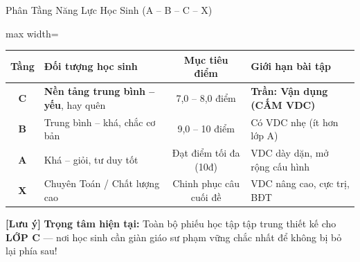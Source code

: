 \documentclass[aspectratio=169,11pt]{beamer}
\begin{document}
\begin{frame}{Phân Tầng Năng Lực Học Sinh (A – B – C – X)}
  \begin{adjustbox}{max width=\textwidth}
    \begin{tabular}{|c|l|c|l|}
      \hline
      \rowcolor{brand!15}
      \textbf{Tầng} & \textbf{Đối tượng học sinh} & \textbf{Mục tiêu điểm} & \textbf{Giới hạn bài tập} \\
      \hline
      \rowcolor{brand!5}
      \textbf{\color{brand}C} & \textbf{Nền tảng trung bình – yếu}, hay quên & 7,0 – 8,0 điểm & \textbf{\color{danger}Trần: Vận dụng (CẤM VDC)} \\
      \hline
      \textbf{B} & Trung bình – khá, chắc cơ bản & 9,0 – 10 điểm & Có VDC nhẹ (ít hơn lớp A) \\
      \hline
      \textbf{A} & Khá – giỏi, tư duy tốt & Đạt điểm tối đa (10đ) & VDC dày dặn, mở rộng cấu hình \\
      \hline
      \textbf{\color{accent}X} & Chuyên Toán / Chất lượng cao & Chinh phục câu cuối đề & VDC nâng cao, cực trị, BĐT \\
      \hline
    \end{tabular}
  \end{adjustbox}
  \vspace{6pt}
  \begin{tcolorbox}[accentcard]
    \scriptsize
    \textbf{[Lưu ý]} \textbf{Trọng tâm hiện tại:} Toàn bộ phiếu học tập tập trung thiết kế cho \textbf{LỚP C} — nơi học sinh cần giàn giáo sư phạm vững chắc nhất để không bị bỏ lại phía sau!
  \end{tcolorbox}
\end{frame}
\end{document}
